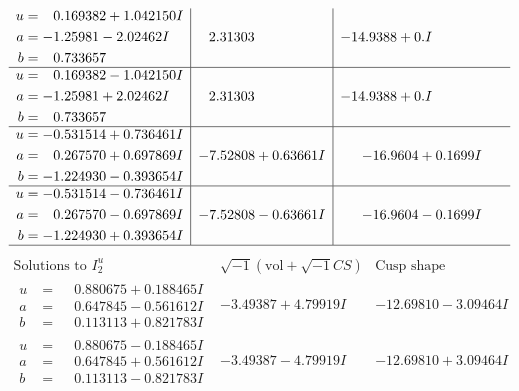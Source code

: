 \documentclass[1p]{elsarticle_modified}
\theoremstyle{definition}
\newcommand{\I}{\sqrt{-1}}
\begin{document}
$$\begin{array}{c|c|c}
\begin{aligned}
u &= \phantom{-}0.169382 + 1.042150 I \\
a &= -1.25981 - 2.02462 I \\
b &= \phantom{-}0.733657\phantom{ +0.000000I}\end{aligned}
 & \phantom{-}2.31303\phantom{ +0.000000I} & -14.9388 + 0. I\phantom{ +0.000000I} \\ \hline\begin{aligned}
u &= \phantom{-}0.169382 - 1.042150 I \\
a &= -1.25981 + 2.02462 I \\
b &= \phantom{-}0.733657\phantom{ +0.000000I}\end{aligned}
 & \phantom{-}2.31303\phantom{ +0.000000I} & -14.9388 + 0. I\phantom{ +0.000000I} \\ \hline\begin{aligned}
u &= -0.531514 + 0.736461 I \\
a &= \phantom{-}0.267570 + 0.697869 I \\
b &= -1.224930 - 0.393654 I\end{aligned}
 & -7.52808 + 0.63661 I & -16.9604 + 0.1699 I \\ \hline\begin{aligned}
u &= -0.531514 - 0.736461 I \\
a &= \phantom{-}0.267570 - 0.697869 I \\
b &= -1.224930 + 0.393654 I\end{aligned}
 & -7.52808 - 0.63661 I & -16.9604 - 0.1699 I\\
 \hline 
 \end{array}$$\newpage$$\begin{array}{c|c|c}  
\text{Solutions to }I^u_{2}& \I (\text{vol} + \sqrt{-1}CS) & \text{Cusp shape}\\
 \hline 
\begin{aligned}
u &= \phantom{-}0.880675 + 0.188465 I \\
a &= \phantom{-}0.647845 - 0.561612 I \\
b &= \phantom{-}0.113113 + 0.821783 I\end{aligned}
 & -3.49387 + 4.79919 I & -12.69810 - 3.09464 I \\ \hline\begin{aligned}
u &= \phantom{-}0.880675 - 0.188465 I \\
a &= \phantom{-}0.647845 + 0.561612 I \\
b &= \phantom{-}0.113113 - 0.821783 I\end{aligned}
 & -3.49387 - 4.79919 I & -12.69810 + 3.09464 I \\ \hline\begin{aligned}

\end{aligned}
\end{array}$$
\end{document}
